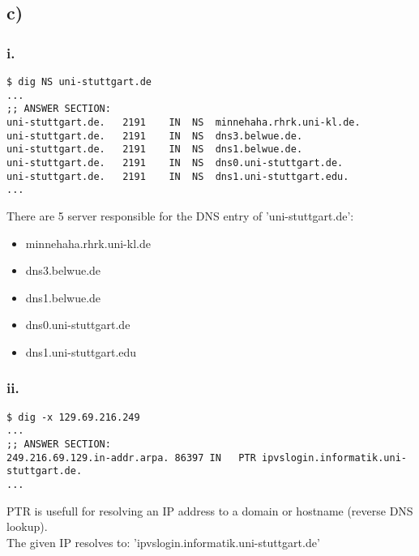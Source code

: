 \documentclass{scrartcl}
\begin{document}
\subsection*{c)}

\lstset{basicstyle=\ttfamily\footnotesize,breaklines=true}
\subsubsection*{i.}
\begin{lstlisting}
$ dig NS uni-stuttgart.de
...
;; ANSWER SECTION:
uni-stuttgart.de.	2191	IN	NS	minnehaha.rhrk.uni-kl.de.
uni-stuttgart.de.	2191	IN	NS	dns3.belwue.de.
uni-stuttgart.de.	2191	IN	NS	dns1.belwue.de.
uni-stuttgart.de.	2191	IN	NS	dns0.uni-stuttgart.de.
uni-stuttgart.de.	2191	IN	NS	dns1.uni-stuttgart.edu.
...
\end{lstlisting}
There are 5 server responsible for the DNS entry of 'uni-stuttgart.de':
\begin{itemize}
	\item minnehaha.rhrk.uni-kl.de
	\item dns3.belwue.de
	\item dns1.belwue.de
	\item dns0.uni-stuttgart.de
	\item dns1.uni-stuttgart.edu
\end{itemize}
\subsubsection*{ii.}
\begin{lstlisting}
$ dig -x 129.69.216.249
...
;; ANSWER SECTION:
249.216.69.129.in-addr.arpa. 86397 IN	PTR	ipvslogin.informatik.uni-stuttgart.de.
...
\end{lstlisting}
PTR is usefull for resolving an IP address to a domain or hostname (reverse DNS lookup).\\
The given IP resolves to: 'ipvslogin.informatik.uni-stuttgart.de'
\end{document}
